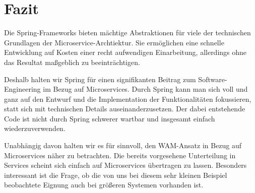 \documentclass{article}
\begin{document}
\section{Fazit}

Die Spring-Frameworks bieten mächtige Abstraktionen für viele der technischen Grundlagen der Microservice-Archtiektur.
Sie ermöglichen eine schnelle Entwicklung auf Kosten einer recht aufwendigen Einarbeitung, allerdings ohne das Resultat maßgeblich zu beeinträchtigen.

Deshalb halten wir Spring für einen signifikanten Beitrag zum Software-Engineering im Bezug auf Microservices.
Durch Spring kann man sich voll und ganz auf den Entwurf und die Implementation der Funktionalitäten fokussieren, statt sich mit technischen Details auseinanderzusetzen.
Der dabei entstehende Code ist nicht durch Spring schwerer wartbar und insgesamt einfach wiederzuverwenden.

Unabhängig davon halten wir es für sinnvoll, den WAM-Ansatz in Bezug auf Microservices näher zu betrachten.
Die bereits vorgesehene Unterteilung in Services scheint sich einfach auf Microservices übertragen zu lassen.
Besonders interessant ist die Frage, ob die von uns bei diesem sehr kleinen Beispiel beobachtete Eignung auch bei größeren Systemen vorhanden ist.



\end{document}
